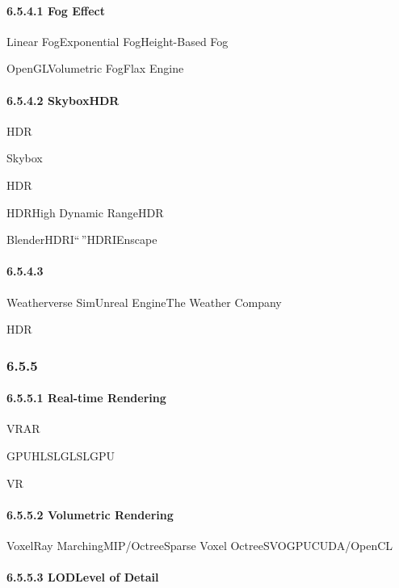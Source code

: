 \hypertarget{fog-effect}{%
\paragraph{6.5.4.1 Fog Effect}\label{fog-effect}}

Linear FogExponential FogHeight-Based Fog

OpenGLVolumetric FogFlax Engine

\hypertarget{skyboxhdr}{%
\paragraph{6.5.4.2 SkyboxHDR}\label{skyboxhdr}}

HDR

Skybox

HDR

HDRHigh Dynamic RangeHDR

BlenderHDRI``\,''HDRIEnscape

\hypertarget{section-115}{%
\paragraph{6.5.4.3}\label{section-115}}

Weatherverse SimUnreal EngineThe Weather Company

HDR

\hypertarget{section-116}{%
\subsubsection{6.5.5}\label{section-116}}

\hypertarget{real-time-rendering}{%
\paragraph{6.5.5.1 Real-time Rendering}\label{real-time-rendering}}

VRAR

GPUHLSLGLSLGPU

VR

\hypertarget{volumetric-rendering}{%
\paragraph{6.5.5.2 Volumetric Rendering}\label{volumetric-rendering}}

VoxelRay MarchingMIP/OctreeSparse Voxel OctreeSVOGPUCUDA/OpenCL

\hypertarget{lodlevel-of-detail}{%
\paragraph{6.5.5.3 LODLevel of Detail}\label{lodlevel-of-detail}}

